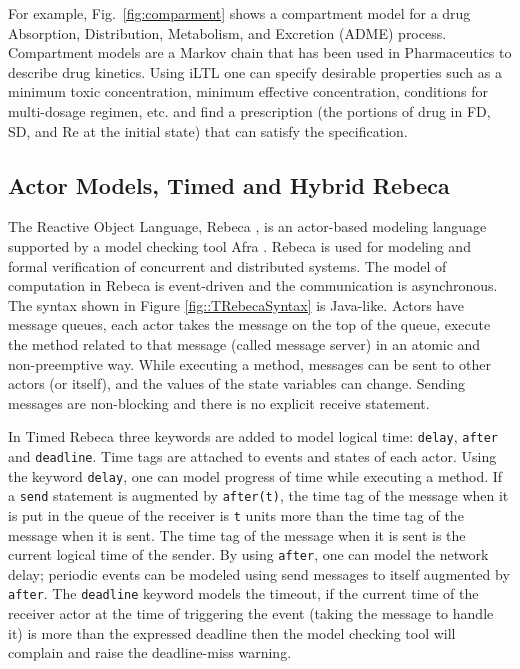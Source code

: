 \documentclass[
graybox,
envcountchap
]{svmult}
\begin{document}
\begin{bibunit}
For example, Fig.~\ref{fig:comparment} shows a compartment model for a drug Absorption, Distribution, Metabolism, and Excretion (ADME) process. Compartment models are a Markov chain that has been used in Pharmaceutics to describe drug kinetics. Using iLTL one can specify desirable properties such as a minimum toxic concentration, minimum effective concentration, conditions for multi-dosage regimen, etc. and find a prescription (the portions of drug in FD, SD, and Re at the initial state) that can satisfy the specification.



\subsection{Actor Models,  Timed and Hybrid Rebeca}
The Reactive Object Language, Rebeca \cite{DBLP:journals/fuin/SirjaniMSB04,DBLP:conf/birthday/SirjaniJ11}, is an actor-based \cite{Hewitt:77:Actors,Agha90} modeling language  supported by a model checking tool Afra \cite{Afra}.
Rebeca is used for modeling and formal verification of concurrent and distributed systems.
The model of computation in  Rebeca is event-driven and the communication is asynchronous.
The syntax shown in Figure \ref{fig::TRebecaSyntax} is Java-like. 
Actors have message queues, each actor takes the message on the top of the queue, execute the method related to that message (called message server) in an atomic and non-preemptive way. While executing a method, messages can be sent to other actors (or itself), and the values of the state variables can change. Sending messages are non-blocking and there is no explicit receive statement.

In Timed Rebeca \cite{DBLP:journals/scp/KhamespanahSSKI15,DBLP:conf/birthday/SirjaniK16} three keywords are added to model logical time: \texttt{delay}, \texttt{after} and \texttt{deadline}. Time tags are attached to events and states of each actor. Using the keyword \texttt{delay}, one can model progress of time while executing a method. If a \texttt{send} statement is augmented by \texttt{after(t)},  the time tag  of the message when it is put in the queue of the receiver is \texttt{t} units more than the time tag of the message when it is sent. The time tag of the message when it is sent is the current logical time of the sender. By using \texttt{after}, one can model the network delay; periodic events can be modeled using send messages to itself augmented by  \texttt{after}.
The \texttt{deadline} keyword models the timeout, if the current time of the receiver actor at the time of triggering the event (taking the message to handle it) is more than the expressed deadline then the model checking tool will complain and raise the deadline-miss warning.


\end{bibunit}
\end{document}

